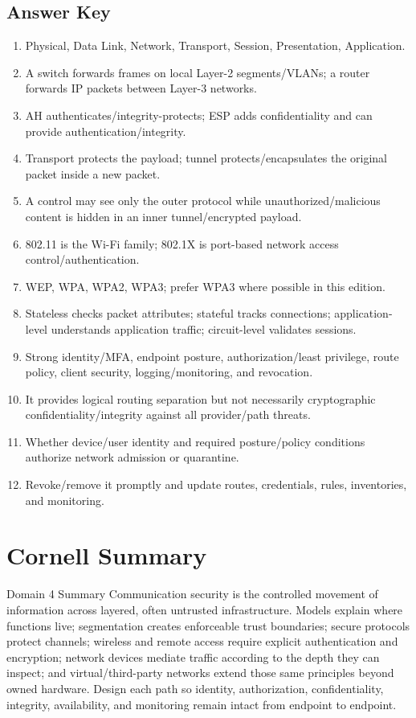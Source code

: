 \documentclass[10pt,letterpaper]{article}
\begin{document}
\subsection*{\color{teal}Answer Key}
\begin{enumerate}
\item Physical, Data Link, Network, Transport, Session, Presentation, Application.
\item A switch forwards frames on local Layer-2 segments/VLANs; a router forwards IP packets between Layer-3 networks.
\item AH authenticates/integrity-protects; ESP adds confidentiality and can provide authentication/integrity.
\item Transport protects the payload; tunnel protects/encapsulates the original packet inside a new packet.
\item A control may see only the outer protocol while unauthorized/malicious content is hidden in an inner tunnel/encrypted payload.
\item 802.11 is the Wi-Fi family; 802.1X is port-based network access control/authentication.
\item WEP, WPA, WPA2, WPA3; prefer WPA3 where possible in this edition.
\item Stateless checks packet attributes; stateful tracks connections; application-level understands application traffic; circuit-level validates sessions.
\item Strong identity/MFA, endpoint posture, authorization/least privilege, route policy, client security, logging/monitoring, and revocation.
\item It provides logical routing separation but not necessarily cryptographic confidentiality/integrity against all provider/path threats.
\item Whether device/user identity and required posture/policy conditions authorize network admission or quarantine.
\item Revoke/remove it promptly and update routes, credentials, rules, inventories, and monitoring.
\end{enumerate}

\section{\color{navy}Cornell Summary}
\begin{summarybox}{Domain 4 Summary}
Communication security is the controlled movement of information across layered, often untrusted infrastructure. Models explain where functions live; segmentation creates enforceable trust boundaries; secure protocols protect channels; wireless and remote access require explicit authentication and encryption; network devices mediate traffic according to the depth they can inspect; and virtual/third-party networks extend those same principles beyond owned hardware. Design each path so identity, authorization, confidentiality, integrity, availability, and monitoring remain intact from endpoint to endpoint.
\end{summarybox}
\end{document}
